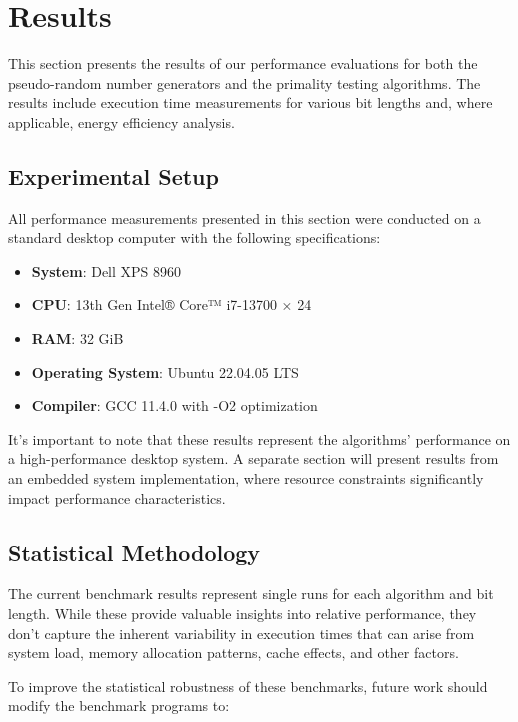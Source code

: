 \section{Results}

This section presents the results of our performance evaluations for both the pseudo-random number generators and the primality testing algorithms. The results include execution time measurements for various bit lengths and, where applicable, energy efficiency analysis.

\subsection{Experimental Setup}

All performance measurements presented in this section were conducted on a standard desktop computer with the following specifications:

\begin{itemize}
    \item \textbf{System}: Dell XPS 8960
    \item \textbf{CPU}: 13th Gen Intel® Core™ i7-13700 × 24
    \item \textbf{RAM}: 32 GiB
    \item \textbf{Operating System}: Ubuntu 22.04.05 LTS
    \item \textbf{Compiler}: GCC 11.4.0 with -O2 optimization
\end{itemize}

It's important to note that these results represent the algorithms' performance on a high-performance desktop system. A separate section will present results from an embedded system implementation, where resource constraints significantly impact performance characteristics.

\subsection{Statistical Methodology}

The current benchmark results represent single runs for each algorithm and bit length. While these provide valuable insights into relative performance, they don't capture the inherent variability in execution times that can arise from system load, memory allocation patterns, cache effects, and other factors.

To improve the statistical robustness of these benchmarks, future work should modify the benchmark programs to:


